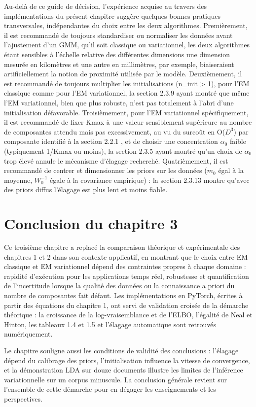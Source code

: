 Au-delà de ce guide de décision, l'expérience acquise au travers des implémentations du présent chapitre suggère quelques bonnes pratiques transversales, indépendantes du choix entre les deux algorithmes. Premièrement, il est recommandé de toujours standardiser ou normaliser les données avant l'ajustement d'un GMM, qu'il soit classique ou variationnel, les deux algorithmes étant sensibles à l'échelle relative des différentes dimensions  une dimension mesurée en kilomètres et une autre en millimètres, par exemple, biaiseraient artificiellement la notion de proximité utilisée par le modèle. Deuxièmement, il est recommandé de toujours multiplier les initialisations (n\_init > 1), pour l'EM classique comme pour l'EM variationnel, la section 2.3.9 ayant montré que même l'EM variationnel, bien que plus robuste, n'est pas totalement à l'abri d'une initialisation défavorable. Troisièmement, pour l'EM variationnel spécifiquement, il est recommandé de fixer Kmax à une valeur sensiblement supérieure au nombre de composantes attendu  mais pas excessivement, au vu du surcoût en O($D^{3}$) par composante identifié à la section 2.2.1 , et de choisir une concentration $\alpha _{0}$ faible (typiquement 1/Kmax ou moins), la section 2.3.5 ayant montré qu'un choix de $\alpha _{0}$ trop élevé annule le mécanisme d'élagage recherché. Quatrièmement, il est recommandé de centrer et dimensionner les priors sur les données ($m_{0}$ égal à la moyenne, $W_{0}^{-1}$ égale à la covariance empirique) : la section 2.3.13 montre qu'avec des priors diffus l'élagage est plus lent et moins fiable.

\section{Conclusion du chapitre 3}
Ce troisième chapitre a replacé la comparaison théorique et expérimentale des chapitres 1 et 2 dans son contexte applicatif, en montrant que le choix entre EM classique et EM variationnel dépend des contraintes propres à chaque domaine : rapidité d'exécution pour les applications temps réel, robustesse et quantification de l'incertitude lorsque la qualité des données ou la connaissance a priori du nombre de composantes fait défaut. Les implémentations en PyTorch, écrites à partir des équations du chapitre 1, ont servi de validation croisée de la démarche théorique : la croissance de la log-vraisemblance et de l'ELBO, l'égalité de Neal et Hinton, les tableaux 1.4 et 1.5 et l'élagage automatique sont retrouvés numériquement.

Le chapitre souligne aussi les conditions de validité des conclusions : l'élagage dépend du calibrage des priors, l'initialisation influence la vitesse de convergence, et la démonstration LDA sur douze documents illustre les limites de l'inférence variationnelle sur un corpus minuscule. La conclusion générale revient sur l'ensemble de cette démarche pour en dégager les enseignements et les perspectives.



